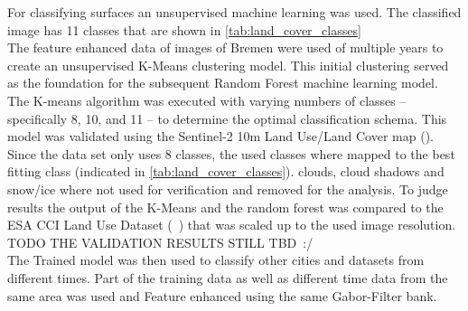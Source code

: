 \documentclass[12pt,a4paper, english,twoside]{article}
\begin{document}
      For classifying surfaces an unsupervised machine learning was used. 
      The classified image has 11 classes that are shown in \cref{tab:land_cover_classes}
      \\
      The feature enhanced data of images of Bremen%
      were used of multiple years to create an unsupervised K-Means clustering model.%
      This initial clustering served as the foundation for the subsequent Random Forest machine learning model.
      The K-means algorithm was executed with varying numbers of classes – specifically 8, 10, and 11 – to determine the optimal classification schema.
      This model was validated using the Sentinel-2 10m Land Use/Land Cover map (\autocite{Zhang}).
      Since the data set only uses 8 classes, the used classes where mapped to the best fitting class (indicated in \cref{tab:land_cover_classes}). 
      clouds, cloud shadows and snow/ice where not used for verification and removed for the analysis.
      To judge results the output of the K-Means and the random forest was compared to the ESA CCI Land Use Dataset (~\autocite{landformclassicationusingfuzzykmeans2000}) that was scaled up to the used image resolution. %
      \\
      TODO THE VALIDATION RESULTS STILL TBD~:/%
      \\ 
      The Trained model was then used to classify other cities and datasets from different times. 
      Part of the training data as well as different time data from the same area was used and Feature enhanced using the same Gabor-Filter bank.
\end{document}
